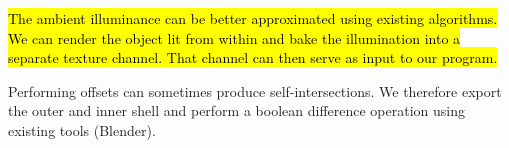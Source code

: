 \hl{The ambient illuminance can be better approximated using existing algorithms.
We can render the object lit from within and bake the illumination into a separate texture channel.
That channel can then serve as input to our program.}


Performing offsets can sometimes produce self-intersections.
We therefore export the outer and inner shell and perform a boolean difference operation using existing tools (Blender).